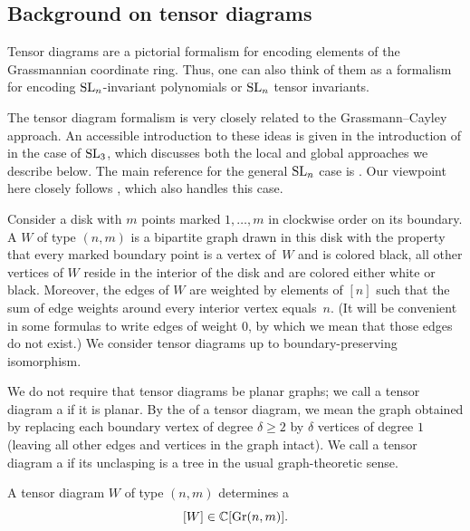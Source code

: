 \subsection{Background on tensor diagrams}\label{sec:TDbackground}
Tensor diagrams are a pictorial formalism for encoding elements of the Grassmannian coordinate ring. Thus, one can also think of them as a formalism for encoding ${\rm SL}_n$-invariant polynomials or ${\rm SL}_n$ tensor invariants.


The tensor diagram formalism is very closely related to the Grassmann--Cayley approach. An accessible introduction to these ideas is given in the introduction of \cite{Fomin.Pylyavskyy} in the case of ${\rm SL}_3$, which discusses both the local and global approaches we describe below. The main reference for the general ${\rm SL}_n$ case is   \cite{Cautis.Kamnitzer.Morrison}. Our viewpoint here closely follows \cite{Fraser.Lam.Le}, which also handles this case.


\begin{definition}\label{defn:tensordiagram}
Consider a disk with $m$ points marked $1,\dots,m$ in clockwise order on its boundary. A  $W$ of type $(n,m)$ is a bipartite graph drawn in this disk with the property that every marked boundary point is a vertex of~$W$ and is colored black, all other vertices of $W$ reside in the interior of the disk and are colored either white or black. Moreover, the edges of $W$ are weighted by elements of $[n]$ such that the sum of edge weights around every interior vertex equals~$n$. (It will be convenient in some formulas to write edges of weight $0$, by which we mean that those edges do not exist.) We consider tensor diagrams up to boundary-preserving isomorphism.
\end{definition}

We do not require that tensor diagrams be planar graphs; we call a tensor diagram a  if it is planar. By the  of a tensor diagram, we mean the graph obtained by replacing each boundary vertex of degree $\delta \geq 2$ by $\delta$ vertices of degree $1$ (leaving all other edges and vertices in the graph intact). We call a tensor diagram a  if its unclasping is a tree in the usual graph-theoretic sense.

A tensor diagram $W$ of type $(n,m)$ determines a  
\begin{equation}\label{eq:globaldefinition}
[W] \in \mathbb{C}[{\rm Gr}(n,m)].
\end{equation}


